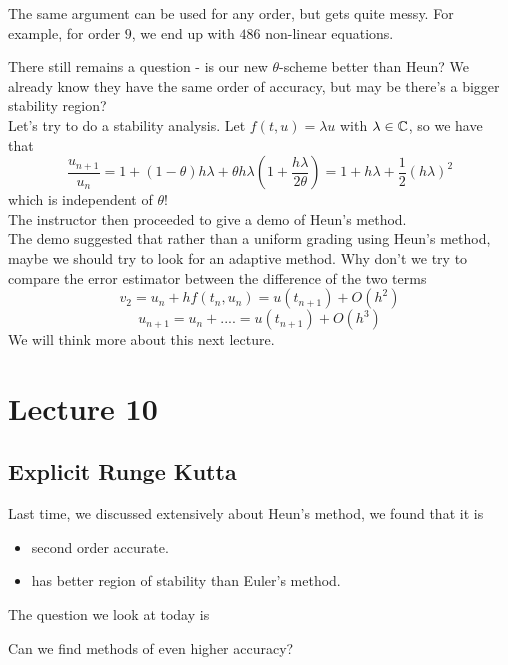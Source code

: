 \documentclass{article}
\begin{document}
\begin{remark}
    The same argument can be used for any order, but gets quite messy. For example, for order $9$, we end up with $486$ non-linear equations.
\end{remark}

There still remains a question - is our new $\theta$-scheme better than Heun? We already know they have the same order of accuracy, but may be there's a bigger stability region?\\

Let's try to do a stability analysis. Let $f(t, u) = \lambda u$ with $\lambda \in \mathbb{C}$, so we have that
\[\frac{u_{n+1}}{u_n} = 1 + (1 - \theta) h \lambda + \theta h \lambda (1 + \frac{h \lambda}{2 \theta}) = 1 + h \lambda + \frac{1}{2} (h \lambda)^2\]
which is independent of $\theta$!\\

The instructor then proceeded to give a demo of Heun's method.\\

The demo suggested that rather than a uniform grading using Heun's method, maybe we should try to look for an adaptive method. Why don't we try to compare the error estimator between the difference of the two terms
\[v_2 = u_n + h f(t_n,u_n) = u(t_{n+1}) + O(h^2)\]
\[u_{n+1} = u_n + .... = u(t_{n+1}) + O(h^3)\]
We will think more about this next lecture.

\newpage
\section{Lecture 10}

\subsection{Explicit Runge Kutta}

Last time, we discussed extensively about Heun's method, we found that it is
\begin{itemize}
    \item second order accurate.
    \item has better region of stability than Euler's method.
\end{itemize}
The question we look at today is
\begin{question}
    Can we find methods of even higher accuracy?
\end{question}
\end{document}
